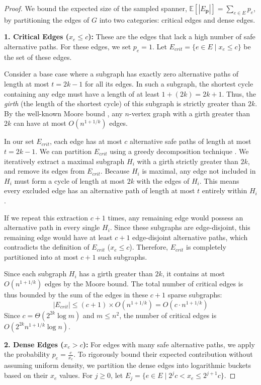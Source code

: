 \documentclass[11pt,a4paper]{article}
\begin{document}
\begin{proof}
We bound the expected size of the sampled spanner, $\mathbb{E}[|E_{\mathbf{p}}|] = \sum_{e \in E} p_e$, by partitioning the edges of $G$ into two categories: critical edges and dense edges.

\textbf{1. Critical Edges ($x_e \le c$):}
These are the edges that lack a high number of safe alternative paths. For these edges, we set $p_e = 1$. Let $E_{crit} = \{e \in E \mid x_e \le c\}$ be the set of these edges.

Consider a base case where a subgraph has exactly zero alternative paths of length at most $t = 2k-1$ for all its edges. In such a subgraph, the shortest cycle containing any edge must have a length of at least $1 + (2k) = 2k+1$. Thus, the \emph{girth} (the length of the shortest cycle) of this subgraph is strictly greater than $2k$. By the well-known Moore bound \cite{alon2002moore}, any $n$-vertex graph with a girth greater than $2k$ can have at most $O(n^{1+1/k})$ edges.

In our set $E_{crit}$, each edge has at most $c$ alternative safe paths of length at most $t = 2k-1$. We can partition $E_{crit}$ using a greedy decomposition technique \cite{althofer1993sparse}. We iteratively extract a maximal subgraph $H_i$ with a girth strictly greater than $2k$, and remove its edges from $E_{crit}$. Because $H_i$ is maximal, any edge not included in $H_i$ must form a cycle of length at most $2k$ with the edges of $H_i$. This means every excluded edge has an alternative path of length at most $t$ entirely within $H_i$.

If we repeat this extraction $c+1$ times, any remaining edge would possess an alternative path in every single $H_i$. Since these subgraphs are edge-disjoint, this remaining edge would have at least $c+1$ edge-disjoint alternative paths, which contradicts the definition of $E_{crit}$ ($x_e \le c$). Therefore, $E_{crit}$ is completely partitioned into at most $c+1$ such subgraphs.

Since each subgraph $H_i$ has a girth greater than $2k$, it contains at most $O(n^{1+1/k})$ edges by the Moore bound. The total number of critical edges is thus bounded by the sum of the edges in these $c+1$ sparse subgraphs:
\[
|E_{crit}| \le (c+1) \times O(n^{1+1/k}) = O(c \cdot n^{1+1/k})
\]
Since $c = \Theta(2^{2k} \log m)$ and $m \le n^2$, the number of critical edges is $O(2^{2k} n^{1+1/k} \log n)$.

\textbf{2. Dense Edges ($x_e > c$):}
For edges with many safe alternative paths, we apply the probability $p_e = \frac{c}{x_e}$. To rigorously bound their expected contribution without assuming uniform density, we partition the dense edges into logarithmic buckets based on their $x_e$ values.
For $j \ge 0$, let $E_j = \{ e \in E \mid 2^j c < x_e \le 2^{j+1} c \}$.


\end{proof}
\end{document}
